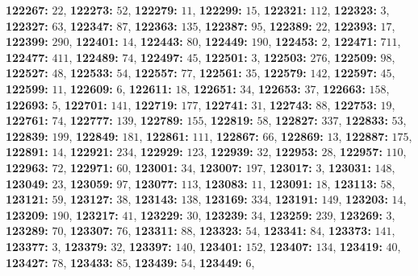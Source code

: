 \textsf{\bfseries 122267:} $22$, \textsf{\bfseries 122273:} $52$, \textsf{\bfseries 122279:} $11$, \textsf{\bfseries 122299:} $15$, \textsf{\bfseries 122321:} $112$, \textsf{\bfseries 122323:} $3$, \textsf{\bfseries 122327:} $63$, \textsf{\bfseries 122347:} $87$, \textsf{\bfseries 122363:} $135$, \textsf{\bfseries 122387:} $95$, \textsf{\bfseries 122389:} $22$, \textsf{\bfseries 122393:} $17$, \textsf{\bfseries 122399:} $290$, \textsf{\bfseries 122401:} $14$, \textsf{\bfseries 122443:} $80$, \textsf{\bfseries 122449:} $190$, \textsf{\bfseries 122453:} $2$, \textsf{\bfseries 122471:} $711$, \textsf{\bfseries 122477:} $411$, \textsf{\bfseries 122489:} $74$, \textsf{\bfseries 122497:} $45$, \textsf{\bfseries 122501:} $3$, \textsf{\bfseries 122503:} $276$, \textsf{\bfseries 122509:} $98$, \textsf{\bfseries 122527:} $48$, \textsf{\bfseries 122533:} $54$, \textsf{\bfseries 122557:} $77$, \textsf{\bfseries 122561:} $35$, \textsf{\bfseries 122579:} $142$, \textsf{\bfseries 122597:} $45$, \textsf{\bfseries 122599:} $11$, \textsf{\bfseries 122609:} $6$, \textsf{\bfseries 122611:} $18$, \textsf{\bfseries 122651:} $34$, \textsf{\bfseries 122653:} $37$, \textsf{\bfseries 122663:} $158$, \textsf{\bfseries 122693:} $5$, \textsf{\bfseries 122701:} $141$, \textsf{\bfseries 122719:} $177$, \textsf{\bfseries 122741:} $31$, \textsf{\bfseries 122743:} $88$, \textsf{\bfseries 122753:} $19$, \textsf{\bfseries 122761:} $74$, \textsf{\bfseries 122777:} $139$, \textsf{\bfseries 122789:} $155$, \textsf{\bfseries 122819:} $58$, \textsf{\bfseries 122827:} $337$, \textsf{\bfseries 122833:} $53$, \textsf{\bfseries 122839:} $199$, \textsf{\bfseries 122849:} $181$, \textsf{\bfseries 122861:} $111$, \textsf{\bfseries 122867:} $66$, \textsf{\bfseries 122869:} $13$, \textsf{\bfseries 122887:} $175$, \textsf{\bfseries 122891:} $14$, \textsf{\bfseries 122921:} $234$, \textsf{\bfseries 122929:} $123$, \textsf{\bfseries 122939:} $32$, \textsf{\bfseries 122953:} $28$, \textsf{\bfseries 122957:} $110$, \textsf{\bfseries 122963:} $72$, \textsf{\bfseries 122971:} $60$, \textsf{\bfseries 123001:} $34$, \textsf{\bfseries 123007:} $197$, \textsf{\bfseries 123017:} $3$, \textsf{\bfseries 123031:} $148$, \textsf{\bfseries 123049:} $23$, \textsf{\bfseries 123059:} $97$, \textsf{\bfseries 123077:} $113$, \textsf{\bfseries 123083:} $11$, \textsf{\bfseries 123091:} $18$, \textsf{\bfseries 123113:} $58$, \textsf{\bfseries 123121:} $59$, \textsf{\bfseries 123127:} $38$, \textsf{\bfseries 123143:} $138$, \textsf{\bfseries 123169:} $334$, \textsf{\bfseries 123191:} $149$, \textsf{\bfseries 123203:} $14$, \textsf{\bfseries 123209:} $190$, \textsf{\bfseries 123217:} $41$, \textsf{\bfseries 123229:} $30$, \textsf{\bfseries 123239:} $34$, \textsf{\bfseries 123259:} $239$, \textsf{\bfseries 123269:} $3$, \textsf{\bfseries 123289:} $70$, \textsf{\bfseries 123307:} $76$, \textsf{\bfseries 123311:} $88$, \textsf{\bfseries 123323:} $54$, \textsf{\bfseries 123341:} $84$, \textsf{\bfseries 123373:} $141$, \textsf{\bfseries 123377:} $3$, \textsf{\bfseries 123379:} $32$, \textsf{\bfseries 123397:} $140$, \textsf{\bfseries 123401:} $152$, \textsf{\bfseries 123407:} $134$, \textsf{\bfseries 123419:} $40$, \textsf{\bfseries 123427:} $78$, \textsf{\bfseries 123433:} $85$, \textsf{\bfseries 123439:} $54$, \textsf{\bfseries 123449:} $6$, 

